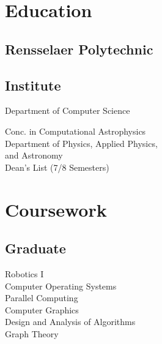 \documentclass[letterpaper]{deedy-resume} %
\begin{document}
\begin{minipage}[t]{0.33\textwidth}
\section{Education} 

\subsection{Rensselaer Polytechnic}
\subsection{Institute}

Department of Computer Science\\

Conc. in Computational Astrophysics \\
Department of Physics, Applied Physics,\\
and Astronomy\\
Dean's List (7/8 Semesters) \\


\section{Coursework}

\subsection{Graduate}
Robotics I\\
Computer Operating Systems\\
Parallel Computing\\
Computer Graphics\\
Design and Analysis of Algorithms\\
Graph Theory\\~\\

\end{minipage}
\end{document}

